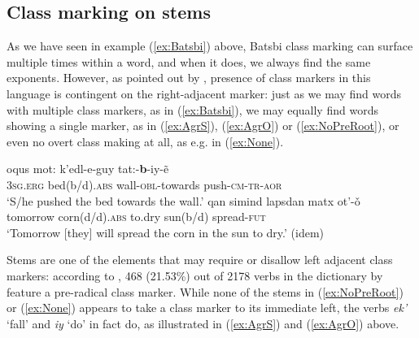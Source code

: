 \documentclass[output=paper]{langsci/langscibook}
\begin{document}
\subsection{Class marking on stems}
\label{sec:Data:Roots}

As we have seen in example (\ref{ex:Batsbi}) above, Batsbi class
marking can surface multiple times within a word, and when it does,
we always find the same exponents. However, as pointed out by
\citet{Harris09}, presence of class markers in this language is
contingent on the right-adjacent marker: just as we may find words
with multiple class markers, as in (\ref{ex:Batsbi}), we may equally
find words showing a single marker, as in
(\ref{ex:AgrS}), (\ref{ex:AgrO}) or (\ref{ex:NoPreRoot}), or even no
overt class making at all, as e.g. in (\ref{ex:None}).

\begin{exe}
  
  \ex \label{ex:NoPreRoot}{\gll oqus mot: k’edl-e-guy tat:-\textbf{b}-iy-ẽ\\
    \textsc{3sg.erg} bed(b/d).\textsc{abs} wall-\textsc{obl}-towards
    push-\textsc{cm-tr-aor}\\
    \glt ‘S/he pushed the bed towards the wall.’ \hfill \citep[275]{Harris09}}
  \ex \label{ex:None}{\gll  qan simind
    lapsdan matx
    ot’-ǒ\\
    tomorrow corn(d/d).\textsc{abs} to.dry
    sun(b/d) spread-\textsc{fut}\\
    \glt ‘Tomorrow [they] will spread the corn in the sun to dry.’
    \hfill (idem)}
\end{exe}

Stems are one of the elements that may require or disallow left adjacent
class markers: according to \citet[fn.~23]{Harris09}, 468 (21.53\%)
out of 2178 verbs in the dictionary by \citet{kadagize84} feature a
pre-radical class marker. While none of the stems in
(\ref{ex:NoPreRoot}) or (\ref{ex:None}) appears to take a class marker
to its immediate left, the verbs \textit{ek'}
`fall' and  \textit{iy} `do' in fact do, as illustrated in (\ref{ex:AgrS}) and (\ref{ex:AgrO})  above.
    

\end{document}
